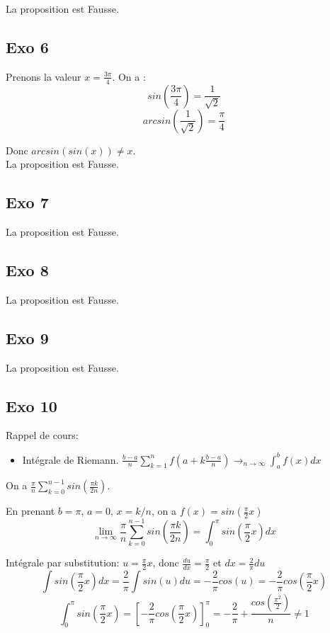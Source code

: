 \documentclass[]{book}
\theoremstyle{definition}
\begin{document}
La proposition est Fausse.

\subsection*{Exo 6}

Prenons la valeur $x=\frac{3\pi}{4}$. On a :
$$sin(\frac{3\pi}{4}) = \frac{1}{\sqrt{2}}$$
$$arcsin(\frac{1}{\sqrt{2}}) = \frac{\pi}{4}$$

Donc $arcsin(sin(x)) \neq x$.\\

La proposition est Fausse.

\subsection*{Exo 7}

La proposition est Fausse.

\subsection*{Exo 8}

La proposition est Fausse.

\subsection*{Exo 9}

La proposition est Fausse.

\subsection*{Exo 10}
Rappel de cours:
\begin{itemize}
\item Int\'egrale de Riemann. $\frac{b-a}{n}\sum_{k=1}^{n}f(a+k\frac{b-a}{n}) \to_{n \to \infty} \int_{a}^{b} f(x)dx$
\end{itemize}

On a $\frac{\pi}{n}\sum_{k=0}^{n-1} sin(\frac{\pi k}{2n})$.

En prenant $b=\pi$, $a=0$, $x=k/n$, on a $f(x) = sin(\frac{\pi}{2}x)$
$$\lim_{n \to \infty}\frac{\pi}{n}\sum_{k=0}^{n-1}sin(\frac{\pi k}{2n}) = \int_0^{\pi}sin(\frac{\pi}{2}x)dx$$

Int\'egrale par substitution: $u=\frac{\pi}{2}x$, donc $\frac{du}{dx} = \frac{\pi}{2}$ et $dx=\frac{2}{\pi}du$
$$\int sin(\frac{\pi}{2}x)dx = \frac{2}{\pi}\int sin(u)du = -\frac{2}{\pi}cos(u) = -\frac{2}{\pi}cos(\frac{\pi}{2}x)$$
$$\int_0^{\pi} sin(\frac{\pi}{2}x) = [-\frac{2}{\pi}cos(\frac{\pi}{2}x)]_0^{\pi} = -\frac{2}{\pi} + \frac{cos(\frac{\pi^2}{2})}{n} \neq 1$$
\end{document}
